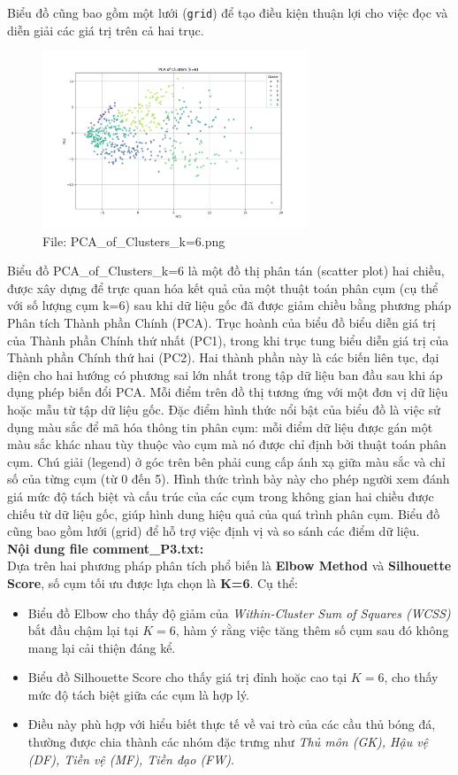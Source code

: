 \documentclass[12pt]{report}
\begin{document}
{Biểu đồ cũng bao gồm một lưới (\texttt{grid}) để tạo điều kiện thuận lợi cho việc đọc và diễn giải các giá trị trên cả hai trục.
\\
\begin{figure}[h]
    \centering
    \includegraphics[width=300px]{PCA_of_Clusters_k=6.png}
    \caption{File: PCA\_of\_Clusters\_k=6.png}
    \label{fig:PCA}
\end{figure}
Biểu đồ PCA\_of\_Clusters\_k=6 là một đồ thị phân tán (scatter plot) hai chiều, được xây dựng để trực quan hóa kết quả của một thuật toán phân cụm (cụ thể với số lượng cụm k=6) sau khi dữ liệu gốc đã được giảm chiều bằng phương pháp Phân tích Thành phần Chính (PCA). Trục hoành của biểu đồ biểu diễn giá trị của Thành phần Chính thứ nhất (PC1), trong khi trục tung biểu diễn giá trị của Thành phần Chính thứ hai (PC2). Hai thành phần này là các biến liên tục, đại diện cho hai hướng có phương sai lớn nhất trong tập dữ liệu ban đầu sau khi áp dụng phép biến đổi PCA. Mỗi điểm trên đồ thị tương ứng với một đơn vị dữ liệu hoặc mẫu từ tập dữ liệu gốc. Đặc điểm hình thức nổi bật của biểu đồ là việc sử dụng màu sắc để mã hóa thông tin phân cụm: mỗi điểm dữ liệu được gán một màu sắc khác nhau tùy thuộc vào cụm mà nó được chỉ định bởi thuật toán phân cụm. Chú giải (legend) ở góc trên bên phải cung cấp ánh xạ giữa màu sắc và chỉ số của từng cụm (từ 0 đến 5). Hình thức trình bày này cho phép người xem đánh giá mức độ tách biệt và cấu trúc của các cụm trong không gian hai chiều được chiếu từ dữ liệu gốc, giúp hình dung hiệu quả của quá trình phân cụm. Biểu đồ cũng bao gồm lưới (grid) để hỗ trợ việc định vị và so sánh các điểm dữ liệu.
\\
\textbf{Nội dung file comment\_P3.txt:}\\
Dựa trên hai phương pháp phân tích phổ biến là \textbf{Elbow Method} và \textbf{Silhouette Score}, số cụm tối ưu được lựa chọn là \textbf{K=6}. Cụ thể:
\begin{itemize}
  \item Biểu đồ Elbow cho thấy độ giảm của \textit{Within-Cluster Sum of Squares (WCSS)} bắt đầu chậm lại tại $K=6$, hàm ý rằng việc tăng thêm số cụm sau đó không mang lại cải thiện đáng kể.
  \item Biểu đồ Silhouette Score cho thấy giá trị đỉnh hoặc cao tại $K=6$, cho thấy mức độ tách biệt giữa các cụm là hợp lý.
  \item Điều này phù hợp với hiểu biết thực tế về vai trò của các cầu thủ bóng đá, thường được chia thành các nhóm đặc trưng như \textit{Thủ môn (GK), Hậu vệ (DF), Tiền vệ (MF), Tiền đạo (FW)}.
\end{itemize}

}
\end{document}
